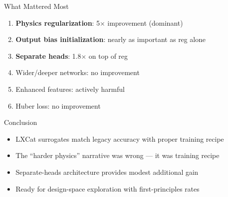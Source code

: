 \documentclass[aspectratio=169]{beamer}
\begin{document}
\begin{frame}{What Mattered Most}
\begin{enumerate}
  \item \textbf{Physics regularization}: 5$\times$ improvement (dominant)
  \item \textbf{Output bias initialization}: nearly as important as reg alone
  \item \textbf{Separate heads}: 1.8$\times$ on top of reg
  \item Wider/deeper networks: no improvement
  \item Enhanced features: actively harmful
  \item Huber loss: no improvement
\end{enumerate}
\end{frame}

\begin{frame}{Conclusion}
\begin{itemize}
  \item LXCat surrogates match legacy accuracy with proper training recipe
  \item The ``harder physics'' narrative was wrong --- it was training recipe
  \item Separate-heads architecture provides modest additional gain
  \item Ready for design-space exploration with first-principles rates
\end{itemize}
\end{frame}
\end{document}
